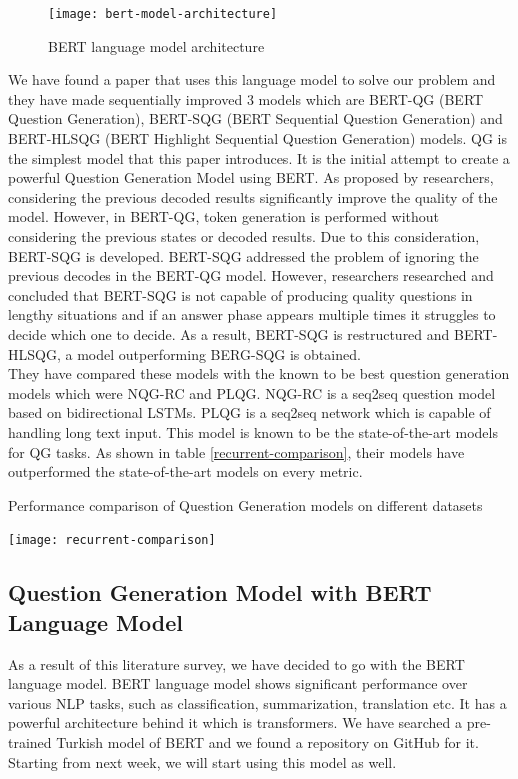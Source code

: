 \documentclass{mefsdp}
\begin{document}
	\begin{figure}[ht!]
		\centering
		\texttt{[image: bert-model-architecture]}
		\caption{BERT language model architecture\label{bert-architecture}}
	\end{figure}
	We have found a paper that uses this language model to solve our problem and they have made sequentially improved 3 models which are BERT-QG (BERT Question Generation), BERT-SQG (BERT Sequential Question Generation) and BERT-HLSQG (BERT Highlight Sequential Question Generation) models. QG is the simplest model that this paper introduces. It is the initial attempt to create a powerful Question Generation Model using BERT. As proposed by researchers, considering the previous decoded results significantly improve the quality of the model. However, in BERT-QG, token generation is performed without considering the previous states or decoded results. Due to this consideration, BERT-SQG is developed. BERT-SQG addressed the problem of ignoring the previous decodes in the BERT-QG model. However, researchers researched and concluded that BERT-SQG is not capable of producing quality questions in lengthy situations and if an answer phase appears multiple times it struggles to decide which one to decide. As a result, BERT-SQG is restructured and BERT-HLSQG, a model outperforming BERG-SQG is obtained.\\
	
	They have compared these models with the known to be best question generation models which were NQG-RC and PLQG. NQG-RC is a seq2seq question model based on bidirectional LSTMs. PLQG is a seq2seq network which is capable of handling long text input. This model is known to be the state-of-the-art models for QG tasks. As shown in table \ref{recurrent-comparison}, their models have outperformed the state-of-the-art models on every metric.\\
	\begin{table}[ht!]
		\caption{Performance comparison of Question Generation models on different datasets\label{recurrent-comparison}}
		\centering
		\texttt{[image: recurrent-comparison]}
	\end{table}
	
	\subsection{Question Generation Model with BERT Language Model}
	As a result of this literature survey, we have decided to go with the BERT language model. BERT language model shows significant performance over various NLP tasks, such as classification, summarization, translation etc. It has a powerful architecture behind it which is transformers. We have searched a pre-trained Turkish model of BERT and we found a repository on GitHub for it. Starting from next week, we will start using this model as well.\\
	
\end{document}
